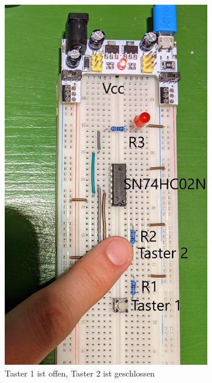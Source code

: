 \documentclass[
    paper=a4,
]{scrartcl}
\begin{document}
\begin{figure}
\begin{subfigure}[t]{0.3\textwidth}
            \includegraphics[width=0.9\linewidth]{Anhang/Bild3.2.jpg}
            \caption{Taster 1 ist offen, Taster 2 ist geschlossen}
        \end{subfigure}\hfill%
        \begin{subfigure}[t]{0.3\textwidth}
            \centering

\end{subfigure}
\end{figure}
\end{document}
